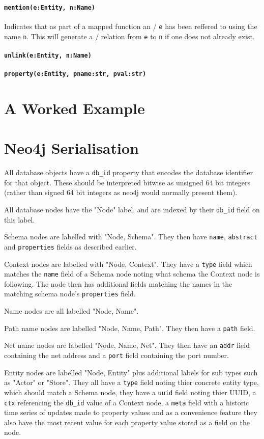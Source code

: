 \documentclass[12pt,twoside,a4paper]{article}
\newcommand{\field}[1]{\texttt{#1}}
\newcommand{\para}[1]{\paragraph{#1\\}}
\begin{document}
\para{\texttt{mention(e:Entity, n:Name)}}
\label{sec:map:verbs:mention}
Indicates that as part of a mapped function an \Entity/ \field{e} has been reffered to using the name \field{n}. This will generate a \NAMED/ relation from \field{e} to \field{n} if one does not already exist.

\para{\texttt{unlink(e:Entity, n:Name)}}
\label{sec:map:verbs:unlink}

\para{\texttt{property(e:Entity, pname:str, pval:str)}}
\label{sec:map:verbs:property}

\appendix

\section{A Worked Example}
\label{app:example}

\section{Neo4j Serialisation}
\label{app:enc:neo4j}

All database objects have a \field{db\_id} property that encodes the database identifier for that object. These should be interpreted bitwise as unsigned 64 bit integers (rather than signed 64 bit integers as neo4j would normally present them).

All database nodes have the "Node" label, and are indexed by their \field{db\_id} field on this label.

Schema nodes are labelled with "Node, Schema". They then have \field{name}, \field{abstract} and \field{properties} fields as described earlier.

Context nodes are labelled with "Node, Context". They have a \field{type} field which matches the \field{name} field of a Schema node noting what schema the Context node is following. The node then has additional fields matching the names in the matching schema node's \field{properties} field.

Name nodes are all labelled "Node, Name".

Path name nodes are labelled "Node, Name, Path". They then have a \field{path} field.

Net name nodes are labelled "Node, Name, Net". They then have an \field{addr} field containing the net address and a \field{port} field containing the port number.

Entity nodes are labelled "Node, Entity" plus additional labels for sub types such as "Actor" or "Store". They all have a \field{type} field noting thier concrete entity type, which should match a Schema node, they have a \field{uuid} field noting thier UUID, a \field{ctx} referencing the \field{db\_id} value of a Context node, a \field{meta} field with a historic time series of updates made to property values and as a convenience feature they also have the most recent value for each property value stored as a field on the node.
\end{document}
